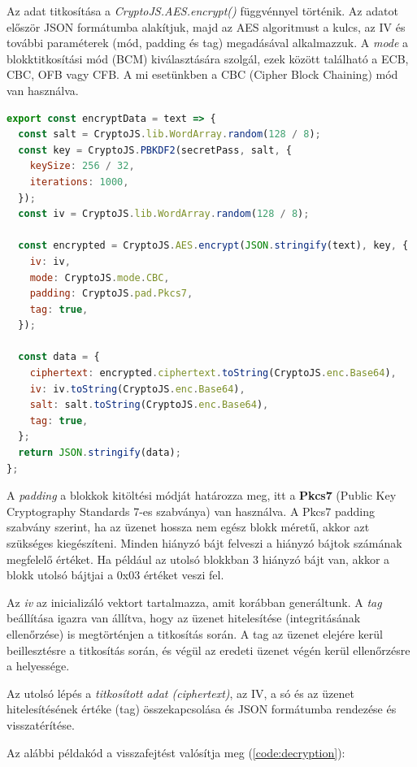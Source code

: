 Az adat titkosítása a \textit{CryptoJS.AES.encrypt()} függvénnyel történik. Az adatot először JSON formátumba alakítjuk, majd az AES algoritmust a kulcs, az IV és további paraméterek (mód, padding és tag) megadásával alkalmazzuk. A \textit{mode} a blokktitkosítási mód (BCM) kiválasztására szolgál, ezek között található a ECB, CBC, OFB vagy CFB. A mi esetünkben a CBC (Cipher Block Chaining) mód van használva.

\begin{lstlisting}[caption={Titkosítás példakód.}, captionpos=b, language = JavaScript, label={code:encryption}]
export const encryptData = text => {
  const salt = CryptoJS.lib.WordArray.random(128 / 8);
  const key = CryptoJS.PBKDF2(secretPass, salt, {
    keySize: 256 / 32,
    iterations: 1000,
  });
  const iv = CryptoJS.lib.WordArray.random(128 / 8);

  const encrypted = CryptoJS.AES.encrypt(JSON.stringify(text), key, {
    iv: iv,
    mode: CryptoJS.mode.CBC,
    padding: CryptoJS.pad.Pkcs7,
    tag: true,
  });

  const data = {
    ciphertext: encrypted.ciphertext.toString(CryptoJS.enc.Base64),
    iv: iv.toString(CryptoJS.enc.Base64),
    salt: salt.toString(CryptoJS.enc.Base64),
    tag: true,
  };
  return JSON.stringify(data);
};
\end{lstlisting}

A \textit{padding} a blokkok kitöltési módját határozza meg, itt a \textbf{Pkcs7} (Public Key Cryptography Standards 7-es szabványa) van használva. A Pkcs7 padding szabvány szerint, ha az üzenet hossza nem egész blokk méretű, akkor azt szükséges kiegészíteni. Minden hiányzó bájt felveszi a hiányzó bájtok számának megfelelő értéket. Ha például az utolsó blokkban 3 hiányzó bájt van, akkor a blokk utolsó bájtjai a 0x03 értéket veszi fel.

Az \textit{iv} az inicializáló vektort tartalmazza, amit korábban generáltunk. A \textit{tag} beállítása igazra van állítva, hogy az üzenet hitelesítése (integritásának ellenőrzése) is megtörténjen a titkosítás során. A tag az üzenet elejére kerül beillesztésre a titkosítás során, és végül az eredeti üzenet végén kerül ellenőrzésre a helyessége.

Az utolsó lépés a \textit{titkosított adat (ciphertext)}, az IV, a só és az üzenet hitelesítésének értéke (tag) összekapcsolása és JSON formátumba rendezése és visszatérítése.

Az alábbi példakód a visszafejtést valósítja meg (\ref{code:decryption}):

